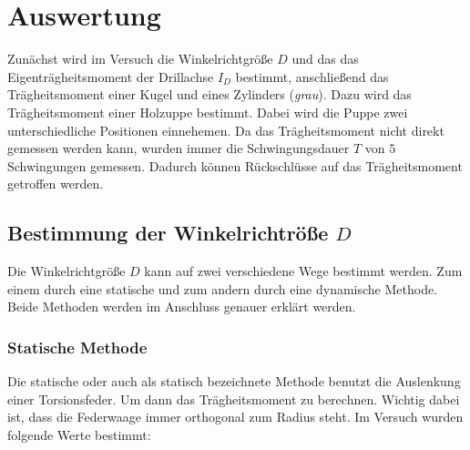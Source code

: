 \section{Auswertung}

Zunächst wird im Versuch die Winkelrichtgröße $D$ und das
das Eigenträgheitsmoment der Drillachse $I_D$ bestimmt, %
anschließend das Trägheitsmoment einer Kugel und eines Zylinders (\emph{grau}).
Dazu wird das Trägheitsmoment einer Holzuppe bestimmt. 
Dabei wird die Puppe zwei unterschiedliche Positionen einnehemen.%
Da das Trägheitsmoment nicht direkt gemessen werden kann, wurden immer
die Schwingungsdauer $T$ von $5$ Schwingungen gemessen.
Dadurch können Rückschlüsse auf das Trägheitsmoment getroffen werden. %

\subsection{Bestimmung der Winkelrichtröße $D$}

Die Winkelrichtgröße $D$ kann auf zwei verschiedene Wege bestimmt werden.
Zum einem durch eine statische und zum andern durch eine dynamische Methode. %
Beide Methoden werden im Anschluss genauer erklärt werden.

\subsubsection{Statische Methode}

Die statische oder auch als statisch bezeichnete Methode benutzt die Auslenkung 
einer Torsionsfeder. Um dann das Trägheitsmoment zu berechnen. %
Wichtig dabei ist, dass die Federwaage immer orthogonal zum Radius steht.
Im Versuch wurden folgende Werte bestimmt:


